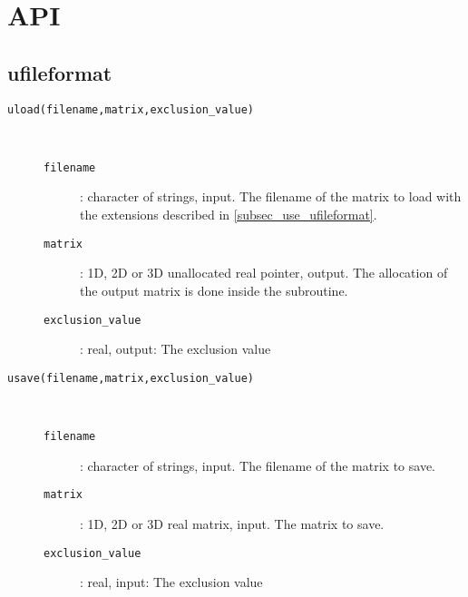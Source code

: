 \documentclass[a4paper,12pt]{article}
\newcommand{\code}{\texttt}
\begin{document}
\section{API}
\subsection{ufileformat}

\begin{description}
\item[\code{uload(filename,matrix,exclusion\_value)}] ~\newline
\begin{description}
\item[\code{filename}]: character of strings, input. The filename of
 the matrix to load with
  the extensions described in \ref{subsec_use_ufileformat}.
\item[\code{matrix}]: 1D, 2D or 3D unallocated real pointer, output. The
  allocation of the output matrix is done inside the subroutine.
\item[\code{exclusion\_value}]: real, output: The exclusion value
\end{description}
\item[\code{usave(filename,matrix,exclusion\_value)}] ~\newline
\begin{description}
\item[\code{filename}]: character of strings, input. The filename of
 the matrix to save.
\item[\code{matrix}]: 1D, 2D or 3D real matrix, input. The matrix to
  save.
\item[\code{exclusion\_value}]: real, input: The exclusion value
\end{description}

\end{description}




\end{document}
